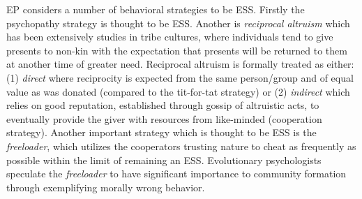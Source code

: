EP considers a number of behavioral strategies to be ESS. Firstly the psychopathy strategy is thought to be ESS. Another is \textit{reciprocal altruism} which has been extensively studies in tribe cultures, where individuals tend to give presents to non-kin with the expectation that presents will be returned to them at another time of greater need. Reciprocal altruism is formally treated as either: (1) \textit{direct} where reciprocity is expected from the same person/group and of equal value as was donated (compared to the tit-for-tat strategy) or (2) \textit{indirect} which relies on good reputation, established through gossip of altruistic acts, to eventually provide the giver with resources from like-minded (cooperation strategy).
Another important strategy which is thought to be ESS is the \textit{freeloader}, which utilizes the cooperators trusting nature to cheat as frequently as possible within the limit of remaining an ESS. Evolutionary psychologists speculate the \textit{freeloader} to have significant importance to community formation through exemplifying morally wrong behavior.

